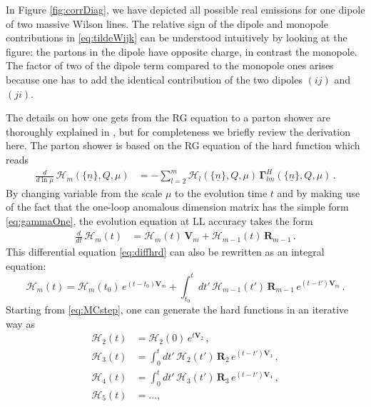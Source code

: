 \documentclass[11pt,a4paper]{article}
\begin{document}
In Figure \ref{fig:corrDiag}, we have depicted all possible real emissions for one dipole of two massive Wilson lines. The relative sign of the dipole and monopole contributions in \eqref{eq:tildeWijk} can be understood intuitively by looking at the figure: the partons in the dipole have opposite charge, in contrast the monopole. The factor of two of the dipole term compared to the monopole ones arises because one has to add the identical contribution of the two dipoles $(ij)$ and $(ji)$.  

The details on how one gets from the RG equation to a parton shower are thoroughly explained in \cite{Balsiger:2018ezi}, but for completeness we briefly review the derivation here. The parton shower is based on the RG equation of the hard function which reads
\begin{align}\label{eq:hrdRG}
	\frac{d}{d\ln\mu}\,\bm{\mathcal{H}}_m(\{\underline{n} \},Q,\mu)  &= - \sum_{l =2}^{m}  \bm{\mathcal{H}}_l(\{\underline{n} \},Q,\mu) \, \bm{\Gamma}^H_{lm}(\{\underline{n}\},Q ,\mu) \, .
\end{align}
By changing variable from the scale $\mu$ to the evolution time $t$ and by making use of the fact that the one-loop anomalous dimension matrix has the simple form \eqref{eq:gammaOne}, the evolution equation at LL accuracy takes the form
\begin{align}\label{eq:diffhrd}
\frac{d}{dt}\,\bm{\mathcal{H}}_m(t)  &=   \bm{\mathcal{H}}_m(t) \,  \bm{V}_m +   \bm{\mathcal{H}}_{m-1}(t) \,  \bm{R}_{m-1} \, . 
\end{align}
 This differential equation \eqref{eq:diffhrd} can also be rewritten as an integral equation:
\begin{equation}\label{eq:MCstep}
\bm{\mathcal{H}}_m(t) = \bm{\mathcal{H}}_m(t_0) \,e^{(t-t_0) \bm{V}_m}
+ \int_{t_0}^{t} dt' \,\bm{\mathcal{H}}_{m-1}(t') \, \bm{R}_{m-1}\, e^{(t-t')  \bm{V}_m}\, .
\end{equation}
Starting from \eqref{eq:MCstep}, one can generate the hard functions in an iterative way as 
\begin{align}\label{eq:iterRG}
\bm{\mathcal{H}}_2(t) &= \bm{\mathcal{H}}_2(0) \,e^{t \bm{V}_2} \, ,\nonumber\\
\bm{\mathcal{H}}_{3}(t) &= \int_{0}^{t} dt' \,\bm{\mathcal{H}}_{2}(t') \, \bm{R}_{2}\, e^{(t-t')  \bm{V}_{3}} \, , \nonumber \\
\bm{\mathcal{H}}_{4}(t) &= \int_{0}^{t} dt' \,\bm{\mathcal{H}}_{3}(t') \, \bm{R}_{3}\, e^{(t-t')  \bm{V}_{4}} \, ,\nonumber \\
\bm{\mathcal{H}}_{5}(t) &= \dots ,
\end{align}
\end{document}
